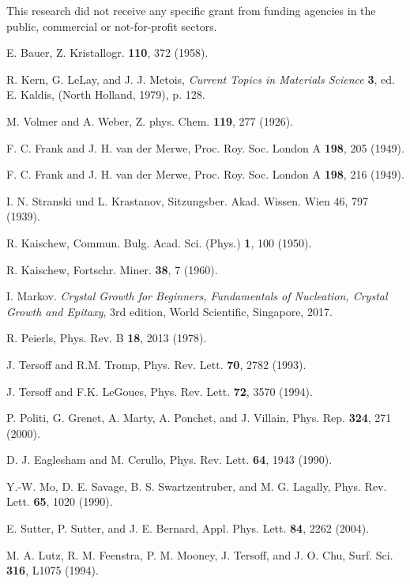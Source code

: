 \documentclass[aps,prl,showpacs,twocolumn,byrevtex,floatfix]{revtex4-1}
\begin{document}
This research did not receive any specific grant from funding agencies in the
public, commercial or not-for-profit sectors.


\begin{thebibliography}{99}

E. Bauer, Z. Kristallogr. {\bf 110}, 372 (1958).

R. Kern, G. LeLay, and J. J. Metois, {\it Current Topics in Materials Science}
{\bf 3}, ed. E. Kaldis, (North Holland, 1979), p. 128.

M. Volmer and A. Weber, Z. phys. Chem. {\bf 119}, 277 (1926).

F. C. Frank and J. H. van der Merwe, Proc. Roy. Soc. London A {\bf 198}, 205
(1949).

F. C. Frank and J. H. van der Merwe, Proc. Roy. Soc. London A {\bf 198}, 216
(1949).

I. N. Stranski und L. Krastanov, Sitzungsber. Akad. Wissen. Wien 46, 797 (1939).

R. Kaischew, Commun. Bulg. Acad. Sci. (Phys.) {\bf 1}, 100 (1950).


R. Kaischew, Fortschr. Miner. {\bf 38}, 7 (1960).

I. Markov. {\it Crystal Growth for Beginners, Fundamentals of Nucleation,
Crystal Growth and Epitaxy}, 3rd edition, World Scientific, Singapore, 2017.

R. Peierls, Phys. Rev. B {\bf 18}, 2013 (1978).

J. Tersoff and R.M. Tromp, Phys. Rev. Lett. {\bf 70}, 2782 (1993).

J. Tersoff and F.K. LeGoues, Phys. Rev. Lett. {\bf 72}, 3570 (1994).

P. Politi, G. Grenet, A. Marty, A. Ponchet, and J. Villain, Phys. Rep. {\bf
324}, 271 (2000).

D. J. Eaglesham and M. Cerullo, Phys. Rev. Lett. {\bf 64}, 1943 (1990).


Y.-W. Mo, D. E. Savage, B. S. Swartzentruber, and M. G. Lagally, Phys. Rev.
Lett. {\bf 65}, 1020 (1990).

E. Sutter, P. Sutter, and J. E. Bernard, Appl. Phys. Lett. {\bf 84}, 2262
(2004).

M. A. Lutz, R. M. Feenstra, P. M. Mooney, J. Tersoff, and J. O. Chu, Surf. Sci.
{\bf 316}, L1075 (1994).


\end{thebibliography}
\end{document}
